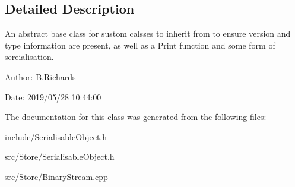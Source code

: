 \subsection{Detailed Description}
An abstract base class for sustom calsses to inherit from to ensure version and type information are present, as well as a Print function and some form of sereialisation.

\begin{DoxyParagraph}{Author\-:}
B.\-Richards 
\end{DoxyParagraph}
\begin{DoxyParagraph}{Date\-:}
2019/05/28 10\-:44\-:00 
\end{DoxyParagraph}


The documentation for this class was generated from the following files\-:\begin{DoxyCompactItemize}
\item 
include/Serialisable\-Object.\-h\item 
src/\-Store/Serialisable\-Object.\-h\item 
src/\-Store/Binary\-Stream.\-cpp\end{DoxyCompactItemize}
